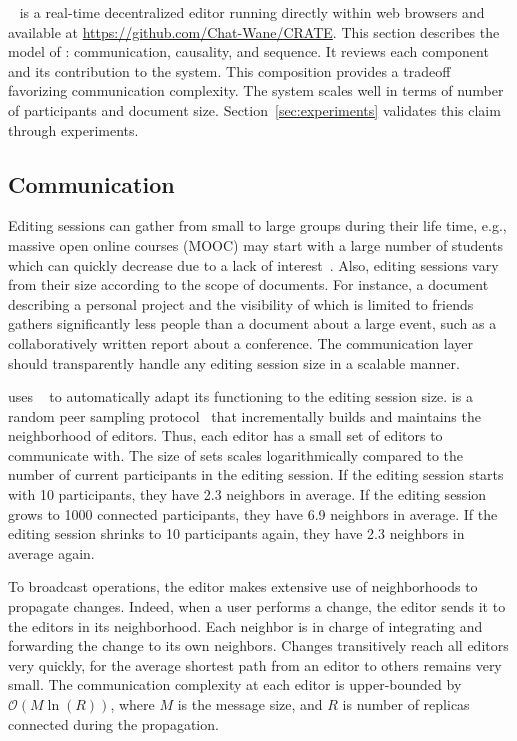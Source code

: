 \CRATE~\cite{nedelec2016crate} is a real-time decentralized editor running
directly within web browsers and available at
\url{https://github.com/Chat-Wane/CRATE}. 
This section describes the model of \CRATE: communication, causality, and
sequence.  It reviews each component and its contribution to the system. This
composition provides a tradeoff favorizing communication complexity. The system
scales well in terms of number of participants and document
size. Section~\ref{sec:experiments} validates this claim through experiments.


\subsection{Communication}
\label{subsec:communication}

Editing sessions can gather from small to large groups during their life time,
e.g., massive open online courses (MOOC) may start with a large number of
students which can quickly decrease due to a lack of
interest~\cite{breslow2013studying}. Also, editing sessions vary from their size
according to the scope of documents. For instance, a document describing a
personal project and the visibility of which is limited to friends gathers
significantly less people than a document about a large event, such as a
collaboratively written report about a conference. The communication layer
should transparently handle any editing session size in a scalable manner.


\CRATE uses \SPRAY~\cite{nedelec2015spray} to automatically adapt its
functioning to the editing session size. \SPRAY is a random peer sampling
protocol~\cite{jelasity2007gossip} that incrementally builds and maintains the
neighborhood of editors. Thus, each editor has a small set of editors to
communicate with. The size of sets scales logarithmically compared to the number
of current participants in the editing session. If the editing session starts
with 10 participants, they have 2.3 neighbors in average. If the editing session
grows to 1000 connected participants, they have 6.9 neighbors in average. If the
editing session shrinks to 10 participants again, they have 2.3 neighbors in
average again.

To broadcast operations, the editor makes extensive use of neighborhoods to
propagate changes. Indeed, when a user performs a change, the editor sends it to
the editors in its neighborhood. Each neighbor is in charge of integrating and
forwarding the change to its own neighbors. Changes transitively reach all
editors very quickly, for the average shortest path from an editor to others
remains very small. The communication complexity at each editor is upper-bounded
by $\mathcal{O}(M \ln(R))$, where $M$ is the message size, and $R$ is number of
replicas connected during the propagation.

